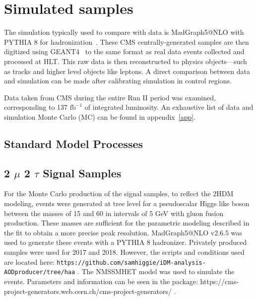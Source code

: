 \section{Simulated samples}

The simulation typically used to compare with data is MadGraph5@NLO with PYTHIA 8 for hadronization~\cite{PYTHIA}. These CMS centrally-generated samples are then digitized using GEANT4~\cite{GEANT4} to the same format as real data events collected and processed at HLT. This raw data is then reconstructed to physics objects---such as tracks and higher level objects like leptons. A direct comparison between data and simulation can be made after calibrating simulation in control regions. 

Data taken from CMS during the entire Run II period was examined, corresponding to 137 $\text{fb}^{-1}$ of integrated luminosity. An exhaustive list of data and simulation Monte Carlo (MC) can be found in appendix~\ref{app}.   

\subsection{Standard Model Processes}
\subsection{2 $\mu$ 2 $\tau$ Signal Samples }
For the Monte Carlo production of the signal samples, to reflect the 2HDM modeling, events were generated at tree level for a pseudoscalar Higgs like boson between the masses of 15 and 60 in intervals of 5 GeV with gluon fusion production. These masses are sufficient for the parametric modeling described in the fit to obtain a more precise peak resolution.
MadGraph5@NLO v2.6.5 was used to generate these events with a PYTHIA 8 hadronizer. Privately produced samples were used for 2017 and 2018. However, the scripts and conditions used are located here:
 \texttt{https://github.com/samhiggie/iDM-analysis-AODproducer/tree/haa} .
The NMSSMHET model was used to simulate the events. Parameters and information can be seen in the package:
https://cms-project-generators.web.cern.ch/cms-project-generators/ .
 

